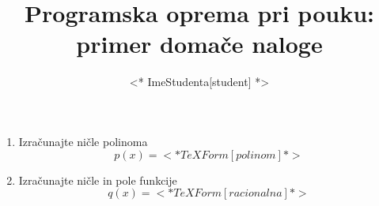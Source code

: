 \documentclass{article} %
\begin{document}
\title{Programska oprema pri pouku: primer domače naloge}
\author{<* ImeStudenta[student] *>} %

\maketitle

\begin{enumerate}
  \item Izračunajte ničle polinoma
  \[
    p(x) = <* TeXForm[polinom] *> %
  \]

  \item Izračunajte ničle in pole funkcije
  \[
    q(x) = <* TeXForm[racionalna] *> %
  \]
\end{enumerate}
\end{document}
